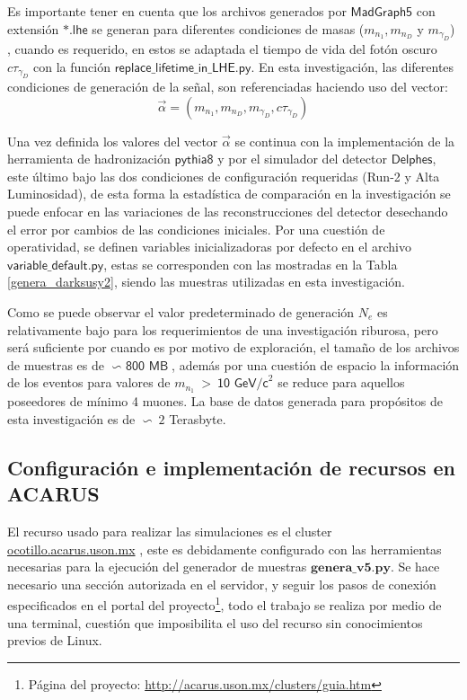 Es importante tener en cuenta que los archivos generados por $\textsf{MadGraph5}$ con extensión $\textsf{*.lhe}$ se generan para diferentes condiciones de masas ($m_{n_1}, m_{n_D}$ y  $m_{\gamma_D}$)%
, cuando  es requerido, en estos se adaptada el tiempo de vida del fotón oscuro $c\tau_{\gamma_D}$ %
con la función $\textsf{replace\_lifetime\_in\_LHE.py}$. En esta investigación, las diferentes condiciones de generación de la señal, son referenciadas haciendo uso del vector:
\begin{equation}
\vec{\alpha} = (m_{n_1}, m_{n_D}, m_{\gamma_D}, c\tau_{\gamma_D})
\end{equation}

Una vez definida los valores del vector $\vec{\alpha}$ se continua con la implementación de la herramienta de hadronización $\textsf{pythia8}$ y por el simulador del detector $\textsf{Delphes}$, este último bajo las dos condiciones de configuración requeridas (Run-2 y Alta Luminosidad), de esta forma la estadística de comparación en la investigación se puede enfocar en las variaciones de las reconstrucciones del detector desechando el error por cambios de las condiciones iniciales. %
Por una cuestión de operatividad, se definen variables inicializadoras por defecto en el archivo $\textsf{variable\_default.py}$, estas se corresponden con las mostradas en la Tabla \ref{genera_darksusy2}, siendo las muestras utilizadas en esta investigación.

Como se puede observar el valor predeterminado de generación $N_e$ es relativamente bajo para los requerimientos de una investigación riburosa, pero será suficiente por cuando es por motivo de exploración, el tamaño de los archivos de muestras es de $\backsim\textsf{ 800 MB}$, además por una cuestión de espacio la información de los eventos para valores de $m_{n_1}~>~\textsf{10 GeV/c}^2$ %
se reduce para aquellos poseedores de mínimo 4 muones. La base de datos generada para propósitos de esta investigación es de $\backsim ~2$ Terasbyte.

\subsection{Configuración e implementación de recursos en ACARUS}

El recurso usado para realizar las simulaciones es el cluster \href{ocotillo.acarus.uson.mx}{ocotillo.acarus.uson.mx}%
, este es debidamente configurado con las herramientas necesarias para la ejecución del generador de muestras $\mathbf{genera
\_v5.py}$. Se hace necesario una sección autorizada en el servidor, y seguir los pasos de conexión especificados en el portal del proyecto\footnote{ Página del proyecto: \href{http://acarus.uson.mx/clusters/guia.htm}{http://acarus.uson.mx/clusters/guia.htm}}, todo el trabajo se realiza por medio de una terminal, cuestión que imposibilita el uso del recurso sin conocimientos previos de Linux.

